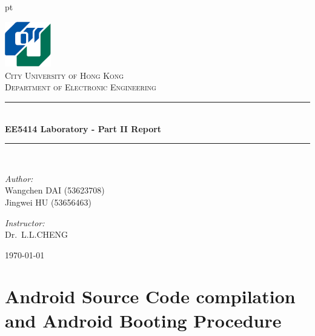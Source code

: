 \documentclass[12pt,journal,draftclsnofoot,onecolumn]{IEEEtran}
\begin{document}

 pt

\begin{titlepage}

\begin{center}


\includegraphics[width=0.15\textwidth]{./figs/logo.png}\\[1cm]    

\textsc{\LARGE City University of Hong Kong}\\[1.5cm]

\textsc{\Large Department  of Electronic Engineering}\\[0.5cm]


\rule{0.9\textwidth}{1pt}\\[0.4cm]
{ \huge \bfseries EE5414 Laboratory - Part II Report}\\[0.4cm]
\rule{0.9\textwidth}{1pt}\\[1.5cm]


\begin{minipage}[t]{0.4\textwidth}
\begin{flushleft} \large
\emph{Author:}\\
Wangchen \textsc{DAI} (53623708)\\
Jingwei \textsc{HU} (53656463)\\
\end{flushleft}
\end{minipage}
\begin{minipage}[t]{0.4\textwidth}
\begin{flushright} \large
\emph{Instructor:} \\
Dr.~L.L.\textsc{CHENG}  
\end{flushright}
\end{minipage}

\vfill

{\large \today}

\end{center}

\end{titlepage}

\clearpage

\section{Android Source Code compilation and Android Booting Procedure}\label{Intro}
\end{document}
